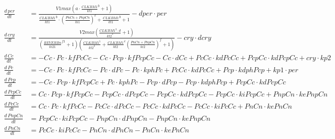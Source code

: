 \begin{table}[p]
\begin{align*}
  \frac{d\,\mathit{per}}{dt} &= \frac{\mathit{V1max} \left(\mathit{a} \cdot {\frac{\mathit{CLKBM1}}{\mathit{kt1}}}^{\mathit{b}} + 1\right)}{{\frac{\mathit{CLKBM1}}{\mathit{kt1}}}^{\mathit{b}} \cdot {(\frac{\mathit{PnCn} + \mathit{PnpCn}}{\mathit{ki1}})}^{\mathit{c}} + {\frac{\mathit{CLKBM1}}{\mathit{kt1}}}^{\mathit{b}} + 1} - \mathit{dper} \cdot \mathit{per}\\
  \frac{d\,\mathit{cry}}{dt} &= \frac{\mathit{V2max}
  \left(\frac{\mathit{CLKBM1}^{3} \cdot \mathit{d}}{\mathit{kt2}^{3}} +
1\right)}{\left({\frac{\mathit{REVERBn}}{\mathit{ki21}}}^{\mathit{f1}} +
1\right) \left(\frac{\mathit{CLKBM1}^{3}}{\mathit{kt2}^{3}} +
{\frac{\mathit{CLKBM1}}{\mathit{kt2}}}^{\mathit{e}}
{\left(\frac{\mathit{PnCn} +
\mathit{PnpCn}}{\mathit{ki2}}\right)}^{\mathit{f}} + 1\right)} - \mathit{cry}
\cdot \mathit{dcry}\\
\frac{d\,\mathit{Cc}}{dt} &= - \mathit{Cc} \cdot \mathit{Pc} \cdot \mathit{kfPcCc} - \mathit{Cc} \cdot \mathit{Pcp} \cdot \mathit{kfPcpCc} - \mathit{Cc} \cdot \mathit{dCc} + \mathit{PcCc} \cdot \mathit{kdPcCc} + \mathit{PcpCc} \cdot \mathit{kdPcpCc} + \mathit{cry} \cdot \mathit{kp2}\\
\frac{d\,\mathit{Pc}}{dt} &= - \mathit{Cc} \cdot \mathit{Pc} \cdot \mathit{kfPcCc} - \mathit{Pc} \cdot \mathit{dPc} - \mathit{Pc} \cdot \mathit{kphPc} + \mathit{PcCc} \cdot \mathit{kdPcCc} + \mathit{Pcp} \cdot \mathit{kdphPcp} + \mathit{kp1} \cdot \mathit{per}\\
\frac{d\,\mathit{Pcp}}{dt} &= - \mathit{Cc} \cdot \mathit{Pcp} \cdot \mathit{kfPcpCc} + \mathit{Pc} \cdot \mathit{kphPc} - \mathit{Pcp} \cdot \mathit{dPcp} - \mathit{Pcp} \cdot \mathit{kdphPcp} + \mathit{PcpCc} \cdot \mathit{kdPcpCc}\\
\frac{d\,\mathit{PcpCc}}{dt} &= \mathit{Cc} \cdot \mathit{Pcp} \cdot \mathit{kfPcpCc} - \mathit{PcpCc} \cdot \mathit{dPcpCc} - \mathit{PcpCc} \cdot \mathit{kdPcpCc} - \mathit{PcpCc} \cdot \mathit{kiPcpCc} + \mathit{PnpCn} \cdot \mathit{kePnpCn}\\
\frac{d\,\mathit{PcCc}}{dt} &= \mathit{Cc} \cdot \mathit{Pc} \cdot \mathit{kfPcCc} - \mathit{PcCc} \cdot \mathit{dPcCc} - \mathit{PcCc} \cdot \mathit{kdPcCc} - \mathit{PcCc} \cdot \mathit{kiPcCc} + \mathit{PnCn} \cdot \mathit{kePnCn}\\
\frac{d\,\mathit{PnpCn}}{dt} &= \mathit{PcpCc} \cdot \mathit{kiPcpCc} - \mathit{PnpCn} \cdot \mathit{dPnpCn} - \mathit{PnpCn} \cdot \mathit{kePnpCn}\\
\frac{d\,\mathit{PnCn}}{dt} &= \mathit{PcCc} \cdot \mathit{kiPcCc} - \mathit{PnCn} \cdot \mathit{dPnCn} - \mathit{PnCn} \cdot \mathit{kePnCn}\\
\end{align*}
\end{table}

